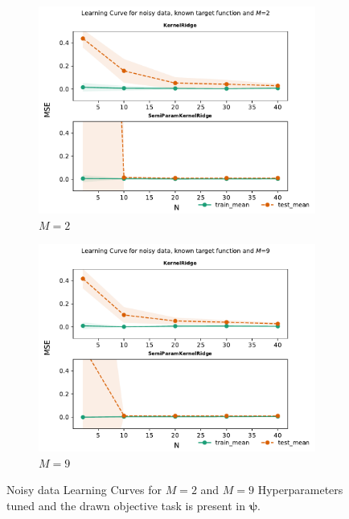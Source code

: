 \documentclass{tran-l}
\theoremstyle{definition}
\theoremstyle{remark}
\numberwithin{equation}{section}
\begin{document}
\begin{figure}[h!]
   \centering
   \begin{subfigure}[b]{0.45\textwidth}
     \centering
     \includegraphics[width=\textwidth]{Figures/knownnoisy/learningcurve2}
     \caption{$M=2$}
   \end{subfigure}
   \hfill
   \begin{subfigure}[b]{0.45\textwidth}
     \centering
     \includegraphics[width=\textwidth]{Figures/knownnoisy/learningcurve9}
     \caption{$M=9$}
   \end{subfigure}
   \caption{Noisy data Learning Curves for $M=2$ and $M=9$ Hyperparameters tuned and the drawn objective task is present in $\boldsymbol{\psi}$.}
\end{figure}
\end{document}
